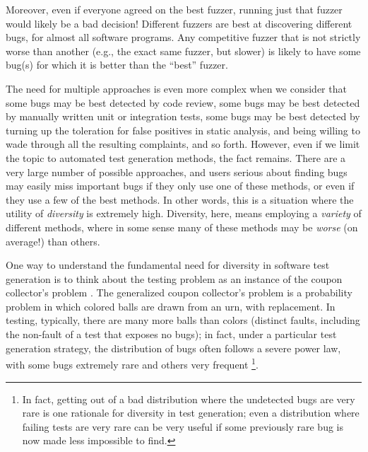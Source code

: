\documentclass[sigplan,review]{acmart}
\begin{document}
Moreover, even if everyone agreed on the best fuzzer, running just
that fuzzer would likely be a bad decision!  Different fuzzers are
best at discovering different bugs, for almost all software programs.
Any competitive fuzzer that is not strictly worse than another (e.g.,
the exact same fuzzer, but slower) is likely to have some bug(s) for
which it is better than the ``best'' fuzzer.

The need for multiple approaches is even more complex when we consider
that some bugs may be best detected by code review, some bugs may be
best detected by manually written unit or integration tests, some bugs
may be best detected by turning up the toleration for false positives
in static analysis, and being willing to wade through all the
resulting complaints, and so forth.  However, even if we limit the
topic to automated test generation methods, the fact remains.  There
are a very large number of possible approaches, and users serious
about finding bugs may easily miss important bugs if they only use one
of these methods, or even if they use a few of the best methods.  In
other words, this is a situation where the utility of \emph{diversity}
is extremely high.  Diversity, here, means employing a \emph{variety} of different
methods, where in some sense many of these methods may be \emph{worse}
(on average!) than others.

One way to understand the fundamental need for diversity in software
test generation is to think about the testing problem as an instance
of the coupon collector's problem \cite{FormalCoupon}.  The
generalized coupon
collector's problem \cite{coupon} is a probability problem in which
colored balls are drawn from an urn, with replacement.  In testing,
typically, there are many more balls than colors (distinct faults,
including the non-fault of a test that exposes no bugs); in fact,
under a particular test generation strategy, the distribution of bugs
often follows a severe power law, with some bugs extremely rare and
others very frequent \cite{Taming}\footnote{In fact, getting out of a
  bad distribution where the undetected bugs are very rare is one
  rationale for diversity in test generation; even a distribution
  where failing tests are very rare can be very useful if some
  previously rare bug is now made less impossible to find.}.
\end{document}
